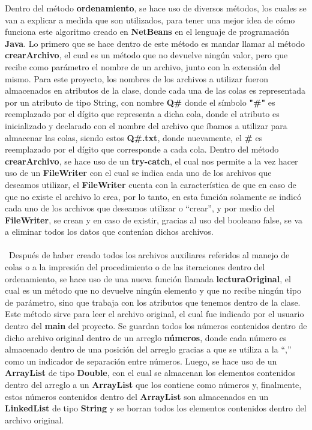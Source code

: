 \documentclass[12pt,letterpaper]{report}
\begin{document}
Dentro del método \textbf{ordenamiento}, se hace uso de diversos métodos, los cuales se van a explicar a medida que son utilizados, para tener una mejor idea de cómo funciona este algoritmo creado en \textbf{NetBeans} en el lenguaje de programación \textbf{Java}. Lo primero que se hace dentro de este método es mandar llamar al método \textbf{crearArchivo}, el cual es un método que no devuelve ningún valor, pero que recibe como parámetro el nombre de un archivo, junto con la extensión del mismo. Para este proyecto, los nombres de los archivos a utilizar fueron almacenados en atributos de la clase, donde cada una de las colas es representada por un atributo de tipo String, con nombre \textbf{Q\# } donde el símbolo \textbf{"\#"} es reemplazado por el dígito que representa a dicha cola, donde el atributo es inicializado y declarado con el nombre del archivo que íbamos a utilizar para almacenar las colas, siendo estos \textbf{Q\#.txt}, donde nuevamente, el \textbf{\#} es reemplazado por el dígito que corresponde a cada cola. Dentro del método \textbf{crearArchivo}, se hace uso de un \textbf{try-catch}, el cual nos permite a la vez hacer uso de un \textbf{FileWriter} con el cual se indica cada uno de los archivos que deseamos utilizar, el \textbf{FileWriter} cuenta con la característica de que en caso de que no existe el archivo lo crea, por lo tanto, en esta función solamente se indicó cada uno de los archivos que deseamos utilizar o “crear”, y por medio del \textbf{FileWriter}, se crean y en caso de existir, gracias al uso del booleano false, se va a eliminar todos los datos que contenían dichos archivos.\\\\\
Después de haber creado todos los archivos auxiliares referidos al manejo de colas o a la impresión del procedimiento o de las iteraciones dentro del ordenamiento, se hace uso de una nueva función llamada \textbf{lecturaOriginal}, el cual es un método que no devuelve ningún elemento y que no recibe ningún tipo de parámetro, sino que trabaja con los atributos que tenemos dentro de la clase. Este método sirve para leer el archivo original, el cual fue indicado por el usuario dentro del \textbf{main} del proyecto. Se guardan todos los números contenidos dentro de dicho archivo original dentro de un arreglo \textbf{números}, donde cada número es almacenado dentro de una posición del arreglo gracias a que se utiliza a la “,” como un indicador de separación entre números. Luego, se hace uso de un \textbf{ArrayList} de tipo \textbf{Double}, con el cual se almacenan los elementos contenidos dentro del arreglo a un \textbf{ArrayList} que los contiene como números y, finalmente, estos números contenidos dentro del \textbf{ArrayList} son almacenados en un \textbf{LinkedList} de tipo \textbf{String} y se borran todos los elementos contenidos dentro del archivo original.\\\\\
\end{document}
